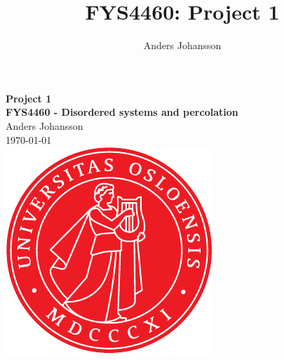 \documentclass[11pt,british,a4paper]{report}
\begin{document}
\title{FYS4460: Project 1}
\author{Anders Johansson}

\begin{titlepage}
\vspace*{\fill}
\begin{center}
\textsf{
    \Huge \textbf{Project 1}\\\vspace{0.5cm}
    \Large \textbf{FYS4460 - Disordered systems and percolation}\\
    \vspace{8cm}
    Anders Johansson\\
    \today\\
}
\vspace{1.5cm}
\includegraphics{uio.pdf}\\
\vspace*{\fill}
\end{center}
\end{titlepage}
\null
\pagestyle{empty}
\newpage

\pagestyle{fancy}
\setcounter{page}{1}



%
\end{document}

